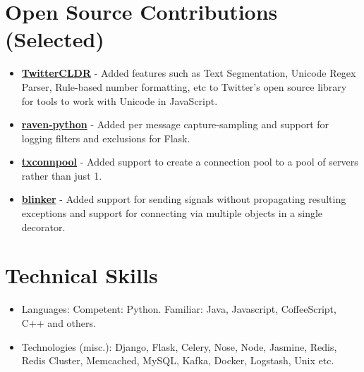 \section{Open Source Contributions
(Selected)}\label{open-source-contributions-selected}

\begin{itemize}
\tightlist
\item
  \href{https://github.com/twitter/twitter-cldr-js}{\textbf{TwitterCLDR}}
  - Added features such as Text Segmentation, Unicode Regex Parser,
  Rule-based number formatting, etc to Twitter's open source library for
  tools to work with Unicode in JavaScript.
\item
  \href{https://github.com/getsentry/raven-python}{\textbf{raven-python}}
  - Added per message capture-sampling and support for logging filters
  and exclusions for Flask.
\item
  \href{https://github.com/zopim/txconnpool}{\textbf{txconnpool}} -
  Added support to create a connection pool to a pool of servers rather
  than just 1.
\item
  \href{https://github.com/zopim/blinker}{\textbf{blinker}} - Added
  support for sending signals without propagating resulting exceptions
  and support for connecting via multiple objects in a single decorator.
\end{itemize}

\section{Technical Skills}\label{technical-skills}

\begin{itemize}
\tightlist
\item
  Languages: Competent: Python. Familiar: Java, Javascript,
  CoffeeScript, C++ and others.
\item
  Technologies (misc.): Django, Flask, Celery, Nose, Node, Jasmine,
  Redis, Redis Cluster, Memcached, MySQL, Kafka, Docker, Logstash, Unix
  etc.
\end{itemize}
